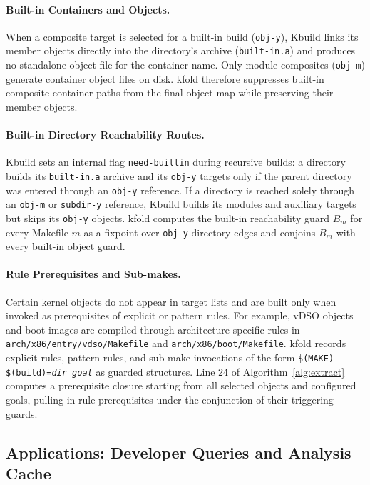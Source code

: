 \documentclass[acmsmall]{acmart}
\newcommand{\tool}{\textsf{kfold}\xspace}
\begin{document}
\paragraph{Built-in Containers and Objects.}
When a composite target is selected for a built-in build (\texttt{obj-y}), Kbuild links its member objects directly into the directory's archive (\texttt{built-in.a}) and produces no standalone object file for the container name.
Only module composites (\texttt{obj-m}) generate container object files on disk.
\tool therefore suppresses built-in composite container paths from the final object map while preserving their member objects.

\paragraph{Built-in Directory Reachability Routes.}
Kbuild sets an internal flag \texttt{need-builtin} during recursive builds: a directory builds its \texttt{built-in.a} archive and its \texttt{obj-y} targets only if the parent directory was entered through an \texttt{obj-y} reference.
If a directory is reached solely through an \texttt{obj-m} or \texttt{subdir-y} reference, Kbuild builds its modules and auxiliary targets but skips its \texttt{obj-y} objects.
\tool computes the built-in reachability guard $B_m$ for every Makefile $m$ as a fixpoint over \texttt{obj-y} directory edges and conjoins $B_m$ with every built-in object guard.

\paragraph{Rule Prerequisites and Sub-makes.}
Certain kernel objects do not appear in target lists and are built only when invoked as prerequisites of explicit or pattern rules.
For example, vDSO objects and boot images are compiled through architecture-specific rules in \texttt{arch/x86/entry/vdso/Makefile} and \texttt{arch/x86/boot/Makefile}.
\tool records explicit rules, pattern rules, and sub-make invocations of the form \texttt{\$(MAKE) \$(build)=\textit{dir} \textit{goal}} as guarded structures.
Line 24 of Algorithm~\ref{alg:extract} computes a prerequisite closure starting from all selected objects and configured goals, pulling in rule prerequisites under the conjunction of their triggering guards.

\subsection{Applications: Developer Queries and Analysis Cache}\label{sec:technique:queries}
\end{document}
